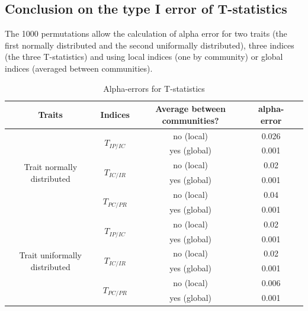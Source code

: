 \documentclass[12pt]{article}\usepackage[]{graphicx}\usepackage[]{color}
\begin{document}
  \subsection {Conclusion on the type I error of T-statistics}

The 1000 permutations allow the calculation of alpha error for two traits (the first normally distributed and the second uniformally distributed), three indices (the three T-statistics) and using local indices (one by community) or global indices (averaged between communities).

\begin{table}[h!]
\begin{center}
\caption{Alpha-errors for T-statistics}
\label{tab:Alpha-errors_for_T-stats}
\begin{tabular}{|c|c|c|c|c|}
\hline
Traits & Indices & Average between communities? & alpha-error \tabularnewline
\hline \hline \hline
\multirow{6}{*}{Trait normally distributed} & \multirow{2}{*}{$T_{IP/IC}$} & no (local) & 0.026 \tabularnewline
\cline{3-4} 
 & & yes (global) & 0.001 \tabularnewline
\cline{2-4} 
 & \multirow{2}{*}{$T_{IC/IR}$} & no (local) & 0.02 \tabularnewline
\cline{3-4} 
 & & yes (global) & 0.001 \tabularnewline
\cline{2-4} 
 & \multirow{2}{*}{$T_{PC/PR}$} & no (local) & 0.04 \tabularnewline
\cline{3-4}
 & & yes (global)& 0.001 \tabularnewline

\hline \hline \hline

\multirow{6}{*}{Trait uniformally distributed} & \multirow{2}{*}{$T_{IP/IC}$} & no (local) & 0.02 \tabularnewline
\cline{3-4}
 & & yes (global) &  0.001 \tabularnewline
\cline{2-4} 
 & \multirow{2}{*}{$T_{IC/IR}$} & no (local) & 0.02 \tabularnewline
\cline{3-4} 
 & & yes (global) &  0.001 \tabularnewline
\cline{2-4} 
 & \multirow{2}{*}{$T_{PC/PR}$} & no (local) & 0.006 \tabularnewline
\cline{3-4} 
 & & yes (global)&  0.001 \tabularnewline
\hline 
\end{tabular}
\end{center}
\end{table}
\end{document}
